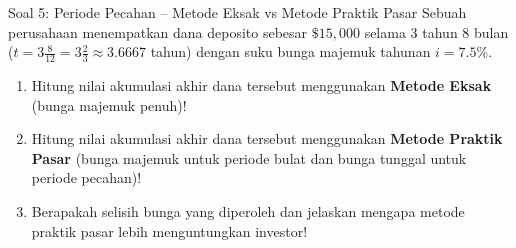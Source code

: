 \documentclass[11pt,a4paper]{article}
\begin{document}
\vspace{1.2em}

\begin{problembox}{Soal 5: Periode Pecahan -- Metode Eksak vs Metode Praktik Pasar}
Sebuah perusahaan menempatkan dana deposito sebesar $\$15{,}000$ selama $3$ tahun $8$ bulan ($t = 3\frac{8}{12} = 3\frac{2}{3} \approx 3.6667$ tahun) dengan suku bunga majemuk tahunan $i = 7.5\%$.
\begin{enumerate}[label=(\alph*)]
    \item Hitung nilai akumulasi akhir dana tersebut menggunakan \textbf{Metode Eksak} (bunga majemuk penuh)!
    \item Hitung nilai akumulasi akhir dana tersebut menggunakan \textbf{Metode Praktik Pasar} (bunga majemuk untuk periode bulat dan bunga tunggal untuk periode pecahan)!
    \item Berapakah selisih bunga yang diperoleh dan jelaskan mengapa metode praktik pasar lebih menguntungkan investor!
\end{enumerate}
\end{problembox}
\end{document}
